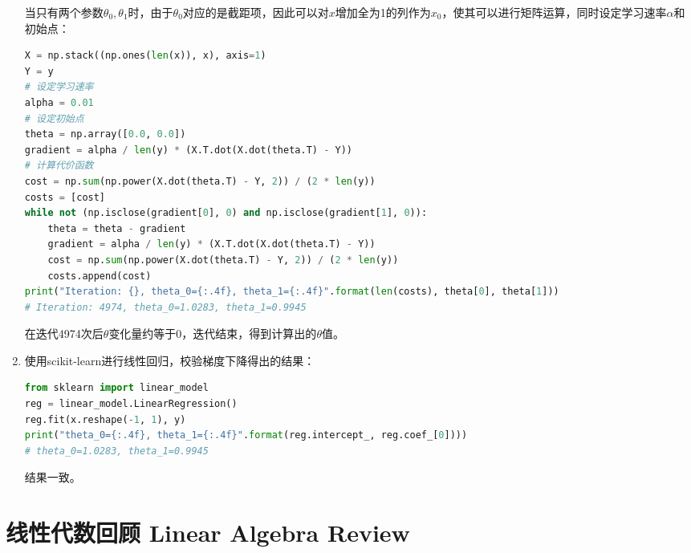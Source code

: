 \documentclass[12pt, a4paper]{article}
\begin{document}
\begin{enumerate}
          当只有两个参数$\theta_0,\theta_1$时，由于$\theta_0$对应的是截距项，因此可以对$x$增加全为1的列作为$x_0$，使其可以进行矩阵运算，同时设定学习速率$\alpha$和初始点：
          
          \begin{lstlisting}[language=Python]
X = np.stack((np.ones(len(x)), x), axis=1)
Y = y
# 设定学习速率
alpha = 0.01
# 设定初始点
theta = np.array([0.0, 0.0])
gradient = alpha / len(y) * (X.T.dot(X.dot(theta.T) - Y))
# 计算代价函数
cost = np.sum(np.power(X.dot(theta.T) - Y, 2)) / (2 * len(y))
costs = [cost]
while not (np.isclose(gradient[0], 0) and np.isclose(gradient[1], 0)):
    theta = theta - gradient
    gradient = alpha / len(y) * (X.T.dot(X.dot(theta.T) - Y))
    cost = np.sum(np.power(X.dot(theta.T) - Y, 2)) / (2 * len(y))
    costs.append(cost)
print("Iteration: {}, theta_0={:.4f}, theta_1={:.4f}".format(len(costs), theta[0], theta[1]))
# Iteration: 4974, theta_0=1.0283, theta_1=0.9945
               \end{lstlisting}
          
          在迭代4974次后$\theta$变化量约等于0，迭代结束，得到计算出的$\theta$值。
          
    \item 
          使用scikit-learn进行线性回归，校验梯度下降得出的结果：
          
          \begin{lstlisting}[language=Python]
from sklearn import linear_model
reg = linear_model.LinearRegression()
reg.fit(x.reshape(-1, 1), y)
print("theta_0={:.4f}, theta_1={:.4f}".format(reg.intercept_, reg.coef_[0])))
# theta_0=1.0283, theta_1=0.9945
               \end{lstlisting}
          
          结果一致。
\end{enumerate}

\section{线性代数回顾 Linear Algebra Review}
\end{document}
